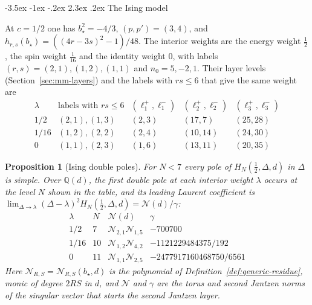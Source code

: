 \documentclass[twoside,10pt]{article}
\makeatletter
\numberwithin{equation}{section}
\theoremstyle{slbody}
\newtheorem{proposition}[theorem]{Proposition}
\theoremstyle{definition}
\theoremstyle{remark}
\renewcommand{\section}{%
  \@startsection{section}{1}{\z@}%
    {-3.5ex \@plus -1ex \@minus -.2ex}%
    {2.3ex \@plus .2ex}%
    {\normalfont\large\bfseries}}
\makeatother
\begin{document}
\section{The Ising model}\label{sec:ising}

At \(c=1/2\) one has \(b_\star^2=-4/3\), \((p,p')=(3,4)\), and
\(h_{r,s}(b_\star)=((4r-3s)^2-1)/48\).  The interior weights are the energy
weight \(\tfrac12\), the spin weight \(\tfrac1{16}\) and the identity weight
\(0\), with labels \((r,s)=(2,1),(1,2),(1,1)\) and \(n_0=5,-2,1\).  Their
layer levels (Section~\ref{sec:mm-layers}) and the labels with \(rs\leq6\) that
give the same weight are
\[
\begin{array}{ccccc}
\lambda&\text{labels with }rs\leq6&(\ell^+_1,\ell^-_1)&
 (\ell^+_2,\ell^-_2)&(\ell^+_3,\ell^-_3)\\ \hline
1/2&(2,1),(1,3)&(2,3)&(17,7)&(25,28)\\
1/16&(1,2),(2,2)&(2,4)&(10,14)&(24,30)\\
0&(1,1),(2,3)&(1,6)&(13,11)&(20,35)
\end{array}
\]

\begin{proposition}[Ising double poles]\label{prop:ising-double-poles}
For \(N<7\) every pole of \(H_N(\tfrac12,\Delta,d)\) in \(\Delta\) is
simple.  Over \(\mathbb Q(d)\), the first double pole at each interior weight
\(\lambda\) occurs at the level \(N\) shown in the table, and its leading
Laurent coefficient is
\(\lim_{\Delta\to\lambda}(\Delta-\lambda)^2H_N(\tfrac12,\Delta,d)=\mathcal N(d)/\gamma\):
\[
\begin{array}{cclr}
\lambda&N&\mathcal N(d)&\gamma\\ \hline
1/2&7&{\mathcal N}_{2,1}{\mathcal N}_{1,5}&-700700\\
1/16&10&{\mathcal N}_{1,2}{\mathcal N}_{4,2}&-1121229484375/192\\
0&11&{\mathcal N}_{1,1}{\mathcal N}_{2,5}&-2477917160468750/6561
\end{array}
\]
Here \({\mathcal N}_{R,S}={\mathcal N}_{R,S}(b_\star,d)\) is the polynomial of
Definition~\ref{def:generic-residue}, monic of degree \(2RS\) in \(d\), and
\(\mathcal N\) and \(\gamma\) are the torus and second Jantzen norms of the singular
vector that starts the second Jantzen layer.
\end{proposition}
\end{document}
